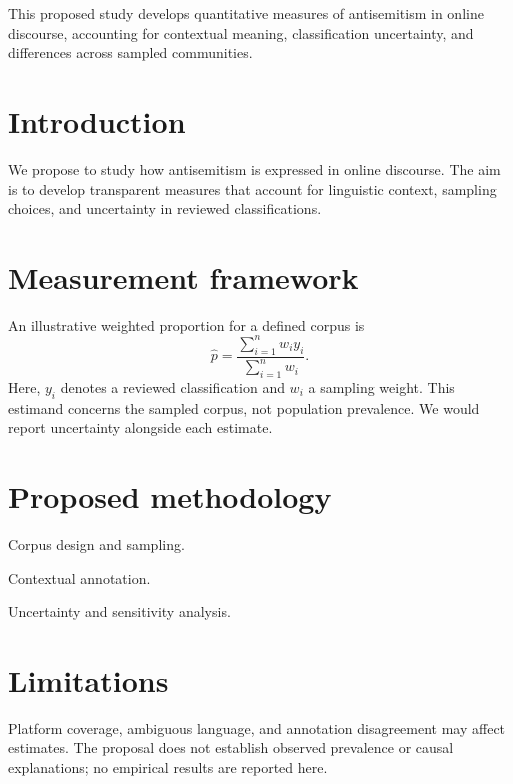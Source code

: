 

\begin{paperabstract}
This proposed study develops quantitative measures of antisemitism in online discourse, accounting for contextual meaning, classification uncertainty, and differences across sampled communities.
\end{paperabstract}

\section{Introduction}
We propose to study how antisemitism is expressed in online discourse. The aim is to develop transparent measures that account for linguistic context, sampling choices, and uncertainty in reviewed classifications.

\section{Measurement framework}
An illustrative weighted proportion for a defined corpus is
\[
  \widehat{p}=\frac{\sum_{i=1}^{n}w_i y_i}{\sum_{i=1}^{n}w_i}.
\]
Here, $y_i$ denotes a reviewed classification and $w_i$ a sampling weight. This estimand concerns the sampled corpus, not population prevalence. We would report uncertainty alongside each estimate.

\section{Proposed methodology}
\begin{methodlist}
  \item Corpus design and sampling.
  \item Contextual annotation.
  \item Uncertainty and sensitivity analysis.
\end{methodlist}

\section{Limitations}
Platform coverage, ambiguous language, and annotation disagreement may affect estimates. The proposal does not establish observed prevalence or causal explanations; no empirical results are reported here.


